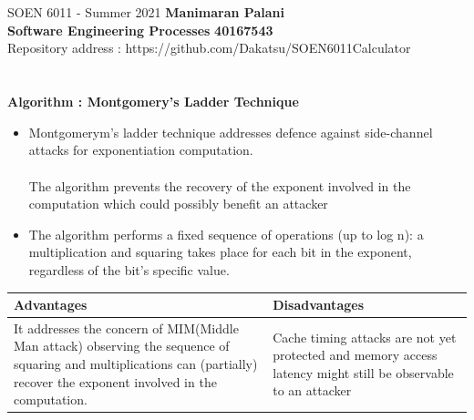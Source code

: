 \documentclass[a4paper, 11pt]{report}
\begin{document}
\section*{}
\normalsize {SOEN 6011 - Summer 2021} \hfill \textbf{Manimaran Palani} \\
\textbf{ Software Engineering Processes}  \hfill \textbf{40167543} \\
\hfill Repository address : https://github.com/Dakatsu/SOEN6011Calculator
\\
\textbf{\\ \\ Algorithm : Montgomery's Ladder Technique}\cite{Peter} 
\begin{itemize}
\item Montgomerym's ladder technique addresses defence against side-channel attacks for exponentiation computation. \\\\
The algorithm prevents the recovery of the exponent involved in the computation which could possibly benefit an attacker
\item The algorithm performs a fixed sequence of operations (up to log n): a multiplication and squaring takes place for each bit in the exponent, regardless of the bit's specific value.
\end{itemize}
\vspace*{0.2in}
\setlength{\tabcolsep}{18pt}
\renewcommand{\arraystretch}{1.5}
\begin{tabular}{ |p{6cm}|p{6cm}| }
\hline
\textbf{Advantages} & \textbf{Disadvantages}
\\ \hline 
It addresses the concern of MIM(Middle Man attack) observing the sequence of squaring and multiplications can (partially) recover the exponent involved in the computation. & Cache timing attacks are not yet protected and memory access latency might still be observable to an attacker\\
\hline
\end{tabular} 
\end{document}

